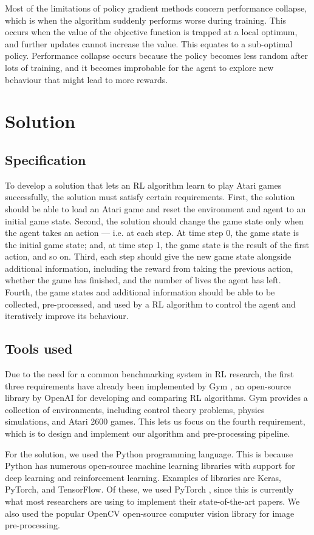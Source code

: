 \documentclass[12pt,a4paper]{article}
\begin{document}
Most of the limitations of policy gradient methods concern performance collapse, which is when the algorithm suddenly performs worse during training. This occurs when the value of the objective function is trapped at a local optimum, and further updates cannot increase the value. This equates to a sub-optimal policy. Performance collapse occurs because the policy becomes less random after lots of training, and it becomes improbable for the agent to explore new behaviour that might lead to more rewards.

\section{Solution}
\subsection{Specification}
To develop a solution that lets an RL algorithm learn to play Atari games successfully, the solution must satisfy certain requirements. First, the solution should be able to load an Atari game and reset the environment and agent to an initial game state. Second, the solution should change the game state only when the agent takes an action --- i.e. at each step. At time step 0, the game state is the initial game state; and, at time step 1, the game state is the result of the first action, and so on. Third, each step should give the new game state alongside additional information, including the reward from taking the previous action, whether the game has finished, and the number of lives the agent has left. Fourth, the game states and additional information should be able to be collected, pre-processed, and used by a RL algorithm to control the agent and iteratively improve its behaviour.

\subsection{Tools used}
Due to the need for a common benchmarking system in RL research, the first three requirements have already been implemented by Gym \cite{1606.01540}, an open-source library by OpenAI for developing and comparing RL algorithms. Gym provides a collection of environments, including control theory problems, physics simulations, and Atari 2600 games. This lets us focus on the fourth requirement, which is to design and implement our algorithm and pre-processing pipeline.

For the solution, we used the Python programming language. This is because Python has numerous open-source machine learning libraries with support for deep learning and reinforcement learning. Examples of libraries are Keras, PyTorch, and TensorFlow. Of these, we used PyTorch \cite{NEURIPS2019_9015}, since this is currently what most researchers are using to implement their state-of-the-art papers. We also used the popular OpenCV \cite{opencv_library} open-source computer vision library for image pre-processing.
\end{document}
